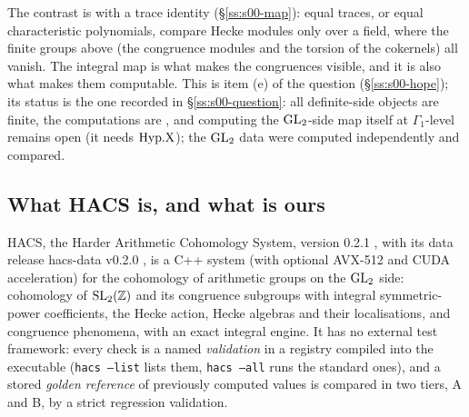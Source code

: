 The contrast is with a trace identity (\S\ref{ss:s00-map}): equal traces, or equal characteristic polynomials, compare Hecke
modules only over a field, where the finite groups above (the congruence modules and the torsion of the cokernels) all vanish. The integral map is what makes the congruences visible, and
it is also what makes them computable. This is item (e) of the question (\S\ref{ss:s00-hope}); its status is the one recorded
in
\S\ref{ss:s00-question}: all definite-side
objects are finite, the computations are \stcomp, and computing the $\mathrm{GL}_2$-side map itself at $\Gamma_1$-level remains open
(it needs $\mathrm{Hyp.X}$); the $\mathrm{GL}_2$ data were computed independently and compared.

\subsection*{What HACS is, and what is ours}
HACS, the Harder Arithmetic Cohomology System, version 0.2.1 \cite{HACS021}, with its data release hacs-data v0.2.0
\cite{HACSdata020}, is a C++ system (with optional AVX-512 and CUDA acceleration) for the cohomology of arithmetic groups on the
$\mathrm{GL}_2$ side: cohomology of $\mathrm{SL}_2(\mathbb{Z})$ and its congruence subgroups with integral symmetric-power coefficients, the Hecke
action, Hecke algebras and their localisations, and congruence phenomena, with an exact integral engine. It has no external test
framework: every check is a named \emph{validation} in a registry compiled into the executable (\texttt{hacs --list} lists them,
\texttt{hacs --all} runs the standard ones), and a stored \emph{golden reference} of previously computed values is compared in
two tiers, A and B, by a strict regression validation.

